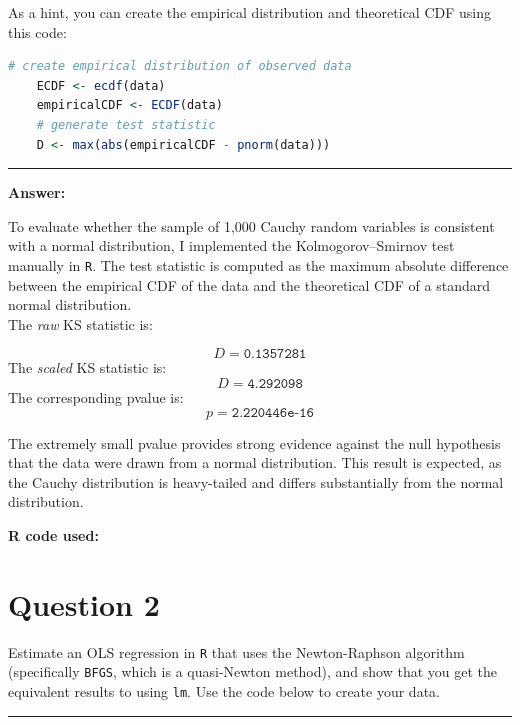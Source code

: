 \documentclass[12pt,letterpaper]{article}
\begin{document}
	
\noindent As a hint, you can create the empirical distribution and theoretical CDF using this code:

\begin{lstlisting}[language=R]
	# create empirical distribution of observed data
	ECDF <- ecdf(data)
	empiricalCDF <- ECDF(data)
	# generate test statistic
	D <- max(abs(empiricalCDF - pnorm(data))) \end{lstlisting}

\vspace{1.5em}
\hrule
\vspace{1.5em}

\noindent\textbf{Answer:}

\noindent To evaluate whether the sample of 1{,}000 Cauchy random variables is consistent with a normal distribution, I implemented the Kolmogorov--Smirnov test manually in \texttt{R}. The test statistic is computed as the maximum absolute difference between the empirical CDF of the data and the theoretical CDF of a standard normal distribution.\\

\noindent The  \textit{raw} KS statistic is:

\[
D = \texttt{0.1357281}
\]
The \textit{scaled} KS statistic is:
\[
D = \texttt{4.292098}
\]
The corresponding p\text{-}value is:
\[
p = \texttt{2.220446e-16}
\]

\noindent The extremely small p\text{-}value provides strong evidence against the null hypothesis that the data were drawn from a normal distribution. This result is expected, as the Cauchy distribution is heavy-tailed and differs substantially from the normal distribution.

\vspace{1.5em}

\noindent\textbf{R code used:}



\newpage
\section*{Question 2}
\noindent Estimate an OLS regression in \texttt{R} that uses the Newton-Raphson algorithm (specifically \texttt{BFGS}, which is a quasi-Newton method), and show that you get the equivalent results to using \texttt{lm}. Use the code below to create your data.
\vspace{1.5em}
\hrule
\vspace{1.5em}
\end{document}
